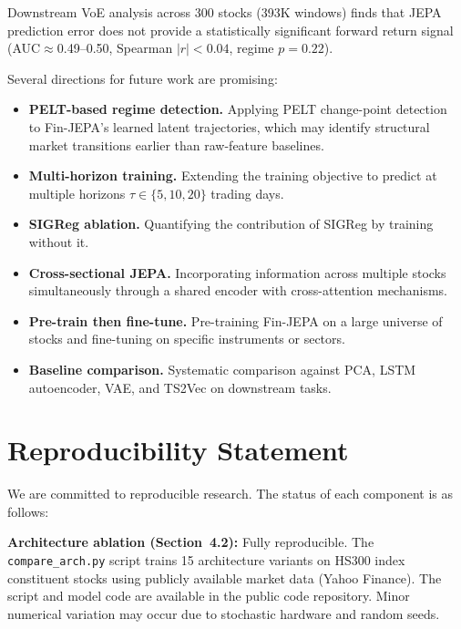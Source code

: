 \documentclass[11pt]{article}
\begin{document}
Downstream VoE analysis across 300 stocks (393K windows) finds that JEPA prediction error does not provide a statistically significant forward return signal (AUC$\approx$0.49--0.50, Spearman $|r|<0.04$, regime $p=0.22$).

Several directions for future work are promising:

\begin{itemize}[nosep]
  \item \textbf{PELT-based regime detection.} Applying PELT change-point detection~\citep{killick2012pelt} to Fin-JEPA's learned latent trajectories, which may identify structural market transitions earlier than raw-feature baselines.
  \item \textbf{Multi-horizon training.} Extending the training objective to predict at multiple horizons $\tau \in \{5, 10, 20\}$ trading days.
  \item \textbf{SIGReg ablation.} Quantifying the contribution of SIGReg by training without it.
  \item \textbf{Cross-sectional JEPA.} Incorporating information across multiple stocks simultaneously through a shared encoder with cross-attention mechanisms.
  \item \textbf{Pre-train then fine-tune.} Pre-training Fin-JEPA on a large universe of stocks and fine-tuning on specific instruments or sectors.
  \item \textbf{Baseline comparison.} Systematic comparison against PCA, LSTM autoencoder, VAE, and TS2Vec on downstream tasks.
\end{itemize}

\section*{Reproducibility Statement}

We are committed to reproducible research. The status of each component is as follows:

\textbf{Architecture ablation (Section~4.2):} Fully reproducible. The \texttt{compare\_arch.py} script trains 15 architecture variants on HS300 index constituent stocks using publicly available market data (Yahoo Finance). The script and model code are available in the public code repository. Minor numerical variation may occur due to stochastic hardware and random seeds.
\end{document}
